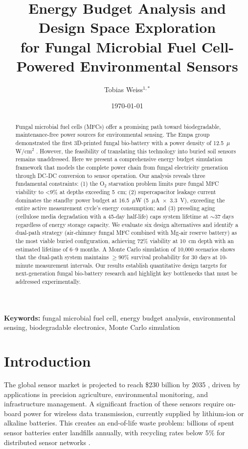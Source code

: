 \documentclass[twocolumn,10pt,a4paper]{article}
\title{Energy Budget Analysis and Design Space Exploration\\for Fungal Microbial Fuel Cell-Powered Environmental Sensors}
\author{Tobias Weiss$^{1,*}$}
\affil{$^{1}$ MykoVolt Research, Gießen, Germany\\
$^{*}$ Corresponding: \texttt{tobias.weiss@mykovolt.de}}
\date{\today}
\begin{document}
\maketitle

\begin{abstract}
Fungal microbial fuel cells (MFCs) offer a promising path toward biodegradable,
maintenance-free power sources for environmental sensing. The Empa group
demonstrated the first 3D-printed fungal bio-battery with a power density of
12.5~$\mu$W/cm$^2$ \cite{reyes2024}. However, the feasibility of translating
this technology into buried soil sensors remains unaddressed. Here we present a
comprehensive energy budget simulation framework that models the complete
power chain from fungal electricity generation through DC-DC conversion to
sensor operation. Our analysis reveals three fundamental constraints: (1) the
O$_2$ starvation problem limits pure fungal MFC viability to \textless 9\% at
depths exceeding 5~cm; (2) supercapacitor leakage current dominates the
standby power budget at 16.5~$\mu$W (5~$\mu$A~$\times$~3.3~V), exceeding the
entire active measurement cycle's energy consumption; and (3) pressling aging
(cellulose media degradation with a 45-day half-life) caps system lifetime at
$\sim$37 days regardless of energy storage capacity. We evaluate six design
alternatives and identify a dual-path strategy (air-chimney fungal MFC
combined with Mg-air reserve battery) as the most viable buried configuration,
achieving 72\% viability at 10~cm depth with an estimated lifetime of 6--9
months. A Monte Carlo simulation of 10,000 scenarios shows that the
dual-path system maintains $\geq$90\% survival probability for 30 days at
10-minute measurement intervals. Our results establish quantitative design
targets for next-generation fungal bio-battery research and highlight key
bottlenecks that must be addressed experimentally.
\end{abstract}

\textbf{Keywords:} fungal microbial fuel cell, energy budget analysis,
environmental sensing, biodegradable electronics, Monte Carlo simulation

\section{Introduction}
\label{sec:intro}

The global sensor market is projected to reach \$230 billion by 2035
\cite{roots2025}, driven by applications in precision agriculture,
environmental monitoring, and infrastructure management. A significant
fraction of these sensors require on-board power for wireless data
transmission, currently supplied by lithium-ion or alkaline batteries. This
creates an end-of-life waste problem: billions of spent sensor batteries enter
landfills annually, with recycling rates below 5\% for distributed sensor
networks \cite{lca2024}.
\end{document}
